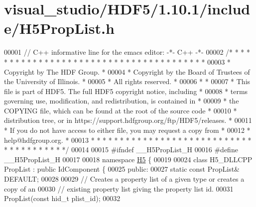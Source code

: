 \hypertarget{visual__studio_2_h_d_f5_21_810_81_2include_2_h5_prop_list_8h_source}{}\section{visual\+\_\+studio/\+H\+D\+F5/1.10.1/include/\+H5\+Prop\+List.h}
\label{visual__studio_2_h_d_f5_21_810_81_2include_2_h5_prop_list_8h_source}

\begin{DoxyCode}
00001 \textcolor{comment}{// C++ informative line for the emacs editor: -*- C++ -*-}
00002 \textcolor{comment}{/* * * * * * * * * * * * * * * * * * * * * * * * * * * * * * * * * * * * * * *}
00003 \textcolor{comment}{ * Copyright by The HDF Group.                                               *}
00004 \textcolor{comment}{ * Copyright by the Board of Trustees of the University of Illinois.         *}
00005 \textcolor{comment}{ * All rights reserved.                                                      *}
00006 \textcolor{comment}{ *                                                                           *}
00007 \textcolor{comment}{ * This file is part of HDF5.  The full HDF5 copyright notice, including     *}
00008 \textcolor{comment}{ * terms governing use, modification, and redistribution, is contained in    *}
00009 \textcolor{comment}{ * the COPYING file, which can be found at the root of the source code       *}
00010 \textcolor{comment}{ * distribution tree, or in https://support.hdfgroup.org/ftp/HDF5/releases.  *}
00011 \textcolor{comment}{ * If you do not have access to either file, you may request a copy from     *}
00012 \textcolor{comment}{ * help@hdfgroup.org.                                                        *}
00013 \textcolor{comment}{ * * * * * * * * * * * * * * * * * * * * * * * * * * * * * * * * * * * * * * */}
00014 
00015 \textcolor{preprocessor}{#ifndef \_\_H5PropList\_H}
00016 \textcolor{preprocessor}{#define \_\_H5PropList\_H}
00017 
00018 \textcolor{keyword}{namespace }\hyperlink{namespace_h5}{H5} \{
00019 
00024 \textcolor{keyword}{class }H5\_DLLCPP PropList : \textcolor{keyword}{public} IdComponent \{
00025    \textcolor{keyword}{public}:
00027         \textcolor{keyword}{static} \textcolor{keyword}{const} PropList& DEFAULT;
00028 
00029         \textcolor{comment}{// Creates a property list of a given type or creates a copy of an}
00030         \textcolor{comment}{// existing property list giving the property list id.}
00031         PropList(\textcolor{keyword}{const} hid\_t plist\_id);
00032 

\end{DoxyCode}
